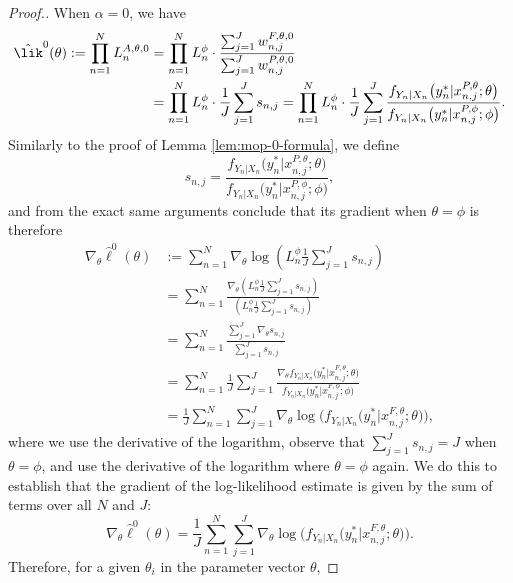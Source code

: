 \begin{proof}[Proof.]
When $\alpha=0$, we have
\begin{align}
    \hat{\lik}^0(\theta) := \prod_{n=1}^N L_n^{A, \theta, 0} &= \prod_{n=1}^N L_n^\phi \cdot \frac{\sum_{j=1}^J w_{n,j}^{F,\theta,0}}{\sum_{j=1}^J w_{n,j}^{P,\theta,0}} 
    \\&
    = \prod_{n=1}^N L_n^\phi \cdot \frac{1}{J}\sum_{j=1}^J s_{n,j} = \prod_{n=1}^N L_n^\phi \cdot \frac{1}{J}\sum_{j=1}^J \frac{f_{Y_n|X_n}\big(y_n^*|x_{n,j}^{P, \theta};\theta\big)}{f_{Y_n|X_n}\big(y_n^*|x_{n,j}^{P, \phi};\phi\big)}.
\end{align}
Similarly to the proof of Lemma \ref{lem:mop-0-formula}, we define 
\begin{equation}
s_{n,j}=\frac{f_{Y_n|X_n}\big(y_n^*|x_{n,j}^{P, \theta};\theta\big)}{f_{Y_n|X_n}\big(y_n^*|x_{n,j}^{P, \phi};\phi\big)},
\end{equation}
and from the exact same arguments conclude that its gradient when $\theta=\phi$ is therefore 
\begin{align}
    \nabla_\theta \hat{\ell}^0(\theta) &:= \sum_{n=1}^N \nabla_\theta \log\left(L_n^\phi \frac{1}{J} \sum_{j=1}^J s_{n,j}\right) \\
    &= \sum_{n=1}^N \frac{\nabla_\theta \left(L_n^\phi \frac{1}{J} \sum_{j=1}^J s_{n,j}\right)}{\left(L_n^\phi \frac{1}{J} \sum_{j=1}^J s_{n,j}\right)} \\
    &= \sum_{n=1}^N \frac{\sum_{j=1}^J \nabla_\theta s_{n,j}}{\sum_{j=1}^J s_{n,j}} \\
    &= \sum_{n=1}^N \frac{1}{J} \sum_{j=1}^J \frac{\nabla_\theta f_{Y_n|X_{n}}\big(y_n^*|x_{n,j}^{F, \theta}; \theta\big)}{f_{Y_n|X_{n}}\big(y_n^*|x_{n,j}^{F, \phi}; \phi\big)} \\
    &= \frac{1}{J} \sum_{n=1}^N \sum_{j=1}^J \nabla_\theta \log\Big(f_{Y_n|X_{n}}\big(y_n^*|x_{n,j}^{F, \theta}; \theta\big)\Big),
\end{align}
where we use the derivative of the logarithm, observe that $\sum_{j=1}^J s_{n,j} = J$ when $\theta=\phi$, and use the derivative of the logarithm where $\theta=\phi$ again. We do this to establish that the gradient of the log-likelihood estimate is given by the sum of terms over all $N$ and $J$:
\begin{equation}
\nabla_\theta \hat{\ell}^0(\theta) = \frac{1}{J} \sum_{n=1}^N \sum_{j=1}^J \nabla_\theta \log\Big(f_{Y_n|X_{n}}\big(y_n^*|x_{n,j}^{F, \theta}; \theta\big)\Big).
\end{equation}
Therefore, for a given $\theta_i$ in the parameter vector $\theta$,

\end{proof}
